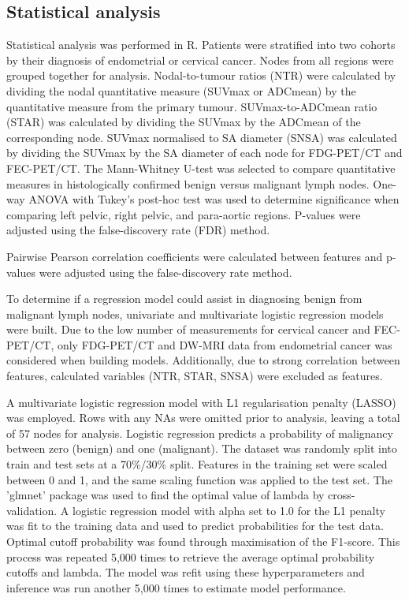 \documentclass[sn-standardnature]{sn-jnl}
\theoremstyle{thmstyleone}%
\theoremstyle{thmstyletwo}%
\theoremstyle{thmstylethree}%
\begin{document}
    \subsection{Statistical analysis}
    Statistical analysis was performed in R. 
    Patients were stratified into two cohorts by their diagnosis of endometrial or cervical cancer. Nodes from all regions were grouped together for analysis.
    Nodal-to-tumour ratios (NTR) were calculated by dividing the nodal quantitative measure (SUVmax or ADCmean) by the quantitative measure from the primary tumour. 
    SUVmax-to-ADCmean ratio (STAR) was calculated by dividing the SUVmax by the ADCmean of the corresponding node. 
    SUVmax normalised to SA diameter (SNSA) was calculated by dividing the SUVmax by the SA diameter of each node for FDG-PET/CT and FEC-PET/CT.
    The Mann-Whitney U-test was selected to compare quantitative measures in histologically confirmed benign versus malignant lymph nodes.
    One-way ANOVA with Tukey's post-hoc test was used to determine significance when comparing left pelvic, right pelvic, and para-aortic regions.
    P-values were adjusted using the false-discovery rate (FDR) method.

    Pairwise Pearson correlation coefficients were calculated between features and p-values were adjusted using the false-discovery rate method. 

    To determine if a regression model could assist in diagnosing benign from malignant lymph nodes, univariate and multivariate logistic regression models were built. 
    Due to the low number of measurements for cervical cancer and FEC-PET/CT, only FDG-PET/CT and DW-MRI data from endometrial cancer was considered when building models.
    Additionally, due to strong correlation between features, calculated variables (NTR, STAR, SNSA) were excluded as features. 

    A multivariate logistic regression model with L1 regularisation penalty (LASSO) was employed. %
    Rows with any NAs were omitted prior to analysis, leaving a total of 57 nodes for analysis.
    Logistic regression predicts a probability of malignancy between zero (benign) and one (malignant). 
    The dataset was randomly split into train and test sets at a 70\%/30\% split. 
    Features in the training set were scaled between 0 and 1, and the same scaling function was applied to the test set. 
    The 'glmnet' package was used to find the optimal value of lambda by cross-validation. A logistic regression model with alpha set to 1.0 for the L1 penalty was fit to the training data and used to predict probabilities for the test data. Optimal cutoff probability was found through maximisation of the F1-score. This process was repeated 5,000 times to retrieve the average optimal probability cutoffs and lambda. 
    The model was refit using these hyperparameters and inference was run another 5,000 times to estimate model performance.
\end{document}
